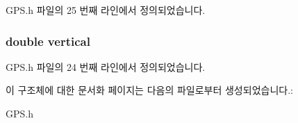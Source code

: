 G\-P\-S.\-h 파일의 25 번째 라인에서 정의되었습니다.

\hypertarget{struct__location_af585cb3fb143047cf641307ab9f5a2f0}{
\subsubsection[{vertical}]{\setlength{\rightskip}{0pt plus 5cm}double vertical}}\label{struct__location_af585cb3fb143047cf641307ab9f5a2f0}


G\-P\-S.\-h 파일의 24 번째 라인에서 정의되었습니다.



이 구조체에 대한 문서화 페이지는 다음의 파일로부터 생성되었습니다.\-:\begin{DoxyCompactItemize}
\item 
G\-P\-S.\-h\end{DoxyCompactItemize}
